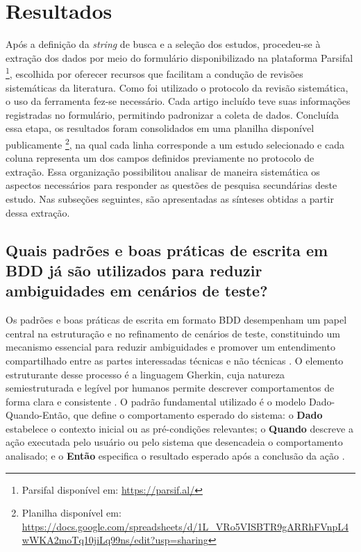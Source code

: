 \section{Resultados}
\label{sec:rsl-resultados}

Após a definição da \textit{string} de busca e a seleção dos estudos, procedeu-se à extração dos dados por meio do formulário disponibilizado na plataforma Parsifal \footnote{Parsifal disponível em: \url{https://parsif.al/}}, escolhida por oferecer recursos que facilitam a condução de revisões sistemáticas da literatura. Como foi utilizado o protocolo da revisão sistemática, o uso da ferramenta fez-se necessário. Cada artigo incluído teve suas informações registradas no formulário, permitindo padronizar a coleta de dados. Concluída essa etapa, os resultados foram consolidados em uma planilha disponível publicamente \footnote{Planilha disponível em: \url{https://docs.google.com/spreadsheets/d/1L_VRo5VISBTR9gARRhFVnpL4wWKA2moTq10jiLq99ns/edit?usp=sharing}}, na qual cada linha corresponde a um estudo selecionado e cada coluna representa um dos campos definidos previamente no protocolo de extração. Essa organização possibilitou analisar de maneira sistemática os aspectos necessários para responder as questões de pesquisa secundárias deste estudo. Nas subseções seguintes, são apresentadas as sínteses obtidas a partir dessa extração.


\subsection{Quais padrões e boas práticas de escrita em BDD já são utilizados para reduzir ambiguidades em cenários de teste?}
\label{qp:2}

Os padrões e boas práticas de escrita em formato BDD desempenham um papel central na estruturação e no refinamento de cenários de teste, constituindo um mecanismo essencial para reduzir ambiguidades e promover um entendimento compartilhado entre as partes interessadas técnicas e não técnicas \cite{Alinezhadtilaki2025}. O elemento estruturante desse processo é a linguagem Gherkin, cuja natureza semiestruturada e legível \cite{Karpurapu2024} por humanos permite descrever comportamentos de forma clara e consistente \cite{Alinezhadtilaki2025}. O padrão fundamental utilizado é o modelo Dado-Quando-Então, que define o comportamento esperado do sistema: o \textbf{Dado} estabelece o contexto inicial ou as pré-condições relevantes; o \textbf{Quando} descreve a ação executada pelo usuário ou pelo sistema que desencadeia o comportamento analisado; e o \textbf{Então} especifica o resultado esperado após a conclusão da ação \cite{GUPTA2023102141}.

